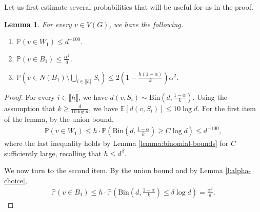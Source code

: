 \documentclass[notitlepage]{scrartcl}
\newcommand{\br}[1]{\llbracket{#1}\rrbracket}
\newtheorem{lemma}[thm]{Lemma}
\begin{document}
Let us first estimate several probabilities that will be useful for us in the proof. 
\begin{lemma}\label{l: probabilities of b1 and w1}
For every $v\in V(G)$, we have the following.
\begin{enumerate}
    \item $\mathbb{P}\left(v\in W_1\right)\le d^{-100}$.
    \item $\mathbb{P}\left(v\in B_1\right)\le \frac{\alpha^2}{d}$.
    \item $\mathbb{P}\left(v\in N(B_1)\setminus \bigcup_{i\in \br{h}}S_i\right)\le 2\left(1-\frac{h(1-\alpha)}{k}\right)\alpha^2$.
\end{enumerate}
\end{lemma}
\begin{proof}
For every $i \in \br{h}$, we have $d(v, S_i) \sim \text{Bin}\left(d,\frac{1-\alpha}{k}\right)$. Using the assumption that $k \ge \frac{d}{10\log d}$, we have $\mathbb{E}[d(v, S_i)] \le 10 \log d$. For the first item of the lemma, by the union bound,
\begin{align*}
    \mathbb{P}\left(v \in W_1\right)\le h\cdot \mathbb{P}\left(\text{Bin}\left(d,\frac{1-\alpha}{k}\right)\ge C\log d\right)\le d^{-100},
\end{align*}
where the last inequality holds by Lemma \ref{lemma:binomial-bounds} for $C$ sufficiently large, recalling that $h\le d^{\beta}$. 

We now turn to the second item. By the union bound and by Lemma \ref{l:alpha-choice},
\begin{align*}
    \mathbb{P}\left(v\in B_1\right)\le h\cdot \mathbb{P}\left(\text{Bin}\left(d,\frac{1-\alpha}{k}\right)\le \delta\log d\right)=\frac{\alpha^2}{d}.
\end{align*}


\end{proof}
\end{document}
